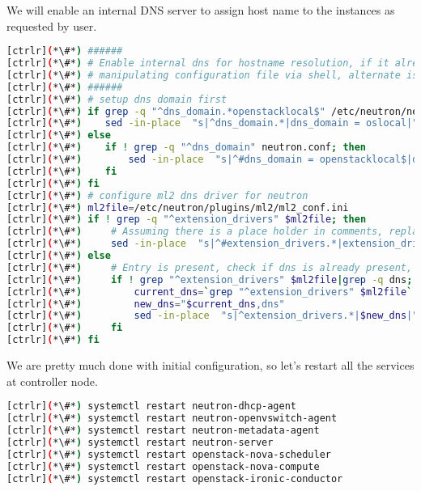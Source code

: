	We will enable an internal DNS server to assign host name to the instances as requested by user. 


\begin{lstlisting}[language=bash,keywords={}]
[ctrlr](*\#*) ######
[ctrlr](*\#*) # Enable internal dns for hostname resolution, if it already not set
[ctrlr](*\#*) # manipulating configuration file via shell, alternate is to use openstack-config (TODO)
[ctrlr](*\#*) ######
[ctrlr](*\#*) # setup dns domain first
[ctrlr](*\#*) if grep -q "^dns_domain.*openstacklocal$" /etc/neutron/neutron.conf; then
[ctrlr](*\#*)    sed -in-place  "s|^dns_domain.*|dns_domain = oslocal|" /etc/neutron/neutron.conf
[ctrlr](*\#*) else
[ctrlr](*\#*)    if ! grep -q "^dns_domain" neutron.conf; then
[ctrlr](*\#*)        sed -in-place  "s|^#dns_domain = openstacklocal$|dns_domain = oslocal|" /etc/neutron/neutron.conf
[ctrlr](*\#*)    fi
[ctrlr](*\#*) fi
[ctrlr](*\#*) # configure ml2 dns driver for neutron
[ctrlr](*\#*) ml2file=/etc/neutron/plugins/ml2/ml2_conf.ini
[ctrlr](*\#*) if ! grep -q "^extension_drivers" $ml2file; then
[ctrlr](*\#*)     # Assuming there is a place holder in comments, replace that string
[ctrlr](*\#*)     sed -in-place  "s|^#extension_drivers.*|extension_drivers = port_security,dns|" $ml2file
[ctrlr](*\#*) else
[ctrlr](*\#*)     # Entry is present, check if dns is already present, if not then enable
[ctrlr](*\#*)     if ! grep "^extension_drivers" $ml2file|grep -q dns; then
[ctrlr](*\#*)         current_dns=`grep "^extension_drivers" $ml2file`
[ctrlr](*\#*)         new_dns="$current_dns,dns"
[ctrlr](*\#*)         sed -in-place  "s|^extension_drivers.*|$new_dns|" $ml2file
[ctrlr](*\#*)     fi
[ctrlr](*\#*) fi
\end{lstlisting} 

	We are pretty much done with initial configuration, so let's restart all the services at controller node.


\begin{lstlisting}[language=bash,keywords={}]
[ctrlr](*\#*) systemctl restart neutron-dhcp-agent
[ctrlr](*\#*) systemctl restart neutron-openvswitch-agent
[ctrlr](*\#*) systemctl restart neutron-metadata-agent
[ctrlr](*\#*) systemctl restart neutron-server
[ctrlr](*\#*) systemctl restart openstack-nova-scheduler
[ctrlr](*\#*) systemctl restart openstack-nova-compute
[ctrlr](*\#*) systemctl restart openstack-ironic-conductor
\end{lstlisting} 
